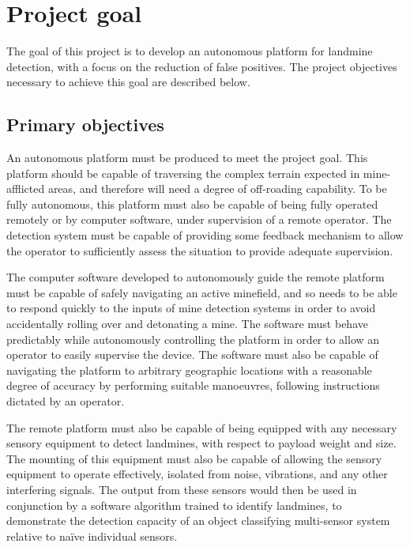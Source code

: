\documentclass[main.tex]{subfiles}
\begin{document}
% 
% 
%

\section{Project goal}

The goal of this project is to develop an autonomous platform for landmine detection, with a focus on the reduction of false positives. The project objectives necessary to achieve this goal are described below.
 
\subsection{Primary objectives}
An autonomous platform must be produced to meet the project goal. 
This platform should be capable of traversing the complex terrain expected in mine-afflicted areas, and therefore will need a degree of off-roading capability. 
To be fully autonomous, this platform must also be capable of being fully operated remotely or by computer software, under supervision of a remote operator. 
The detection system must be capable of providing some feedback mechanism to allow the operator to sufficiently assess the situation to provide adequate supervision.

The computer software developed to autonomously guide the remote platform must be capable of safely navigating an active minefield, and so needs to be able to respond quickly to the inputs of mine detection systems in order to avoid accidentally rolling over and detonating a mine. 
The software must behave predictably while autonomously controlling the platform in order to allow an operator to easily supervise the device. 
The software must also be capable of navigating the platform to arbitrary geographic locations with a reasonable degree of accuracy by performing suitable manoeuvres, following instructions dictated by an operator.

The remote platform must also be capable of being equipped with any necessary sensory equipment to detect landmines, with respect to payload weight and size. 
The mounting of this equipment must also be capable of allowing the sensory equipment to operate effectively, isolated from noise, vibrations, and any other interfering signals. 
The output from these sensors would then be used in conjunction by a software algorithm trained to identify landmines, to demonstrate the detection capacity of an object classifying multi-sensor system relative to naïve individual sensors.
\end{document}
